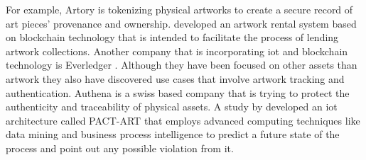 For example, Artory \cite{artory} is tokenizing physical artworks to create a secure record of art pieces' provenance and ownership. \textcite{artrentalblockchain} developed an artwork rental system based on blockchain technology that is intended to facilitate the process of lending artwork collections. Another company that is incorporating \gls{iot} and blockchain technology is Everledger \cite{everledger}. Although they have been focused on other assets than artwork they also have discovered use cases that involve artwork tracking and authentication. Authena \cite{authena} is a swiss based company that is trying to protect the authenticity and traceability of physical assets. A study by \textcite{pactart} developed an \gls{iot} architecture called PACT-ART that employs advanced computing techniques like data mining and business process intelligence to predict a future state of the process and point out any possible violation from it.



